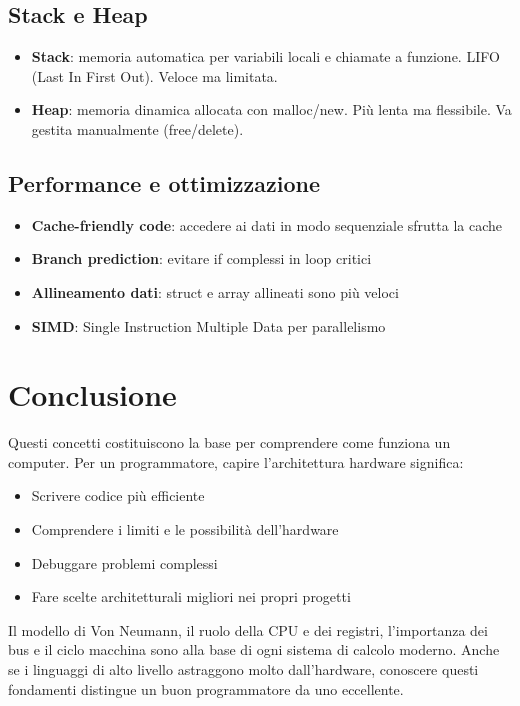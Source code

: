 \documentclass[12pt,a4paper]{article}
\begin{document}
\subsection{\texorpdfstring{\colorbox{gray!50}{Stack e Heap}}{}}
\begin{itemize}
    \item \textbf{Stack}: memoria automatica per variabili locali e chiamate a funzione. LIFO (Last In First Out). Veloce ma limitata.
    \item \textbf{Heap}: memoria dinamica allocata con malloc/new. Più lenta ma flessibile. Va gestita manualmente (free/delete).
\end{itemize}

\subsection{\texorpdfstring{\colorbox{gray!50}{Performance e ottimizzazione}}{}}
\begin{itemize}
    \item \textbf{Cache-friendly code}: accedere ai dati in modo sequenziale sfrutta la cache
    \item \textbf{Branch prediction}: evitare if complessi in loop critici
    \item \textbf{Allineamento dati}: struct e array allineati sono più veloci
    \item \textbf{SIMD}: Single Instruction Multiple Data per parallelismo
\end{itemize}

\section{Conclusione}
Questi concetti costituiscono la base per comprendere come funziona un computer. Per un programmatore, capire l'architettura hardware significa:

\begin{itemize}
    \item Scrivere codice più efficiente
    \item Comprendere i limiti e le possibilità dell'hardware
    \item Debuggare problemi complessi
    \item Fare scelte architetturali migliori nei propri progetti
\end{itemize}

Il modello di Von Neumann, il ruolo della CPU e dei registri, l'importanza dei bus e il ciclo macchina sono alla base di ogni sistema di calcolo moderno. Anche se i linguaggi di alto livello astraggono molto dall'hardware, conoscere questi fondamenti distingue un buon programmatore da uno eccellente.
\end{document}
